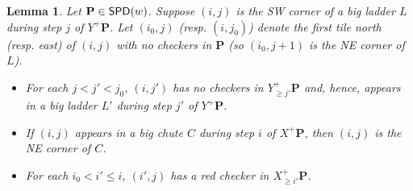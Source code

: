 \documentclass[11pt,reqno]{amsart} %
\newcommand{\bfP}{\mathbf{P}}
\DeclareMathOperator{\SPD}{\sf{SPD}}
\newtheorem{lemma}[theorem]{Lemma}
\theoremstyle{definition}
\begin{document}
\begin{lemma}
\label{lem:SW corner of big ladder}
    Let $\bfP\in \SPD(w)$.
    Suppose $(i,j)$ is the SW corner of a big ladder $L$ during step $j$ of $Y^+\bfP$.
    Let $(i_0,j)$ (resp. $(i,j_0)$) denote the first tile north (resp. east) of $(i,j)$ with no checkers in $\bfP$ (so $(i_0,j+1)$ is the NE corner of $L$).
    
    \begin{itemize}
    \item[(i)]
    For each $j<j'< j_0$, $(i,j')$ has no checkers in $Y^+_{\geq j'} \bfP$ and, hence, appears in a big ladder $L'$ during step $j'$ of $Y^+\bfP$.
    
    \item[(ii)]
    If $(i,j)$ appears in a big chute $C$ during step $i$ of $X^+\bfP$, then $(i,j)$ is the NE corner of $C$.
    
    \item[(iii)]
    For each $i_0 < i'\leq i$, $(i',j)$ has a red checker in $X^+_{\geq i'} \bfP$.
    \end{itemize}
\end{lemma}
\end{document}
